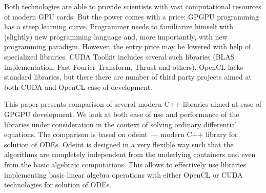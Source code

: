 \documentclass[1p]{elsarticle}
\begin{document}
Both technologies are able to provide scientists with vast computational
resources of modern GPU cards. But the power comes with a price: GPGPU
programming has a steep learning curve. Programmer needs to familiarize
himself with (slightly) new programming language and, more importantly, with
new programming paradigm. However, the entry price may be lowered with help of
specialized libraries. CUDA Toolkit includes several such libraries (BLAS
implementation, Fast Fourier Transform, Thrust and others). OpenCL lacks
standard libraries, but there there are number of third party projects aimed at
both CUDA and OpenCL ease of development.

This paper presents comparison of several modern C++ libraries aimed at ease of
GPGPU development. We look at both ease of use and performance of the libraries
under consideration in the context of solving ordinary differential equations.
The comparison is based on odeint~--- modern C++ library for solution of ODEs.
Odeint is designed in a very flexible way such that the algorithms are
completely independent from the underlying containers and even from the basic
algebraic computations. This allows to effectively use libraries implementing
basic linear algebra operations with either OpenCL or CUDA technologies for
solution of ODEs.
\end{document}
